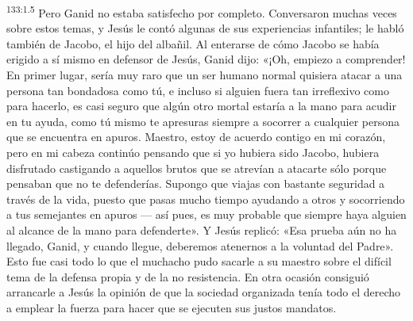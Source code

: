 \par 
\textsuperscript{133:1.5} Pero Ganid no estaba satisfecho por completo. Conversaron muchas veces sobre estos temas, y Jesús le contó algunas de sus experiencias infantiles; le habló también de Jacobo, el hijo del albañil. Al enterarse de cómo Jacobo se había erigido a sí mismo en defensor de Jesús, Ganid dijo: «¡Oh, empiezo a comprender! En primer lugar, sería muy raro que un ser humano normal quisiera atacar a una persona tan bondadosa como tú, e incluso si alguien fuera tan irreflexivo como para hacerlo, es casi seguro que algún otro mortal estaría a la mano para acudir en tu ayuda, como tú mismo te apresuras siempre a socorrer a cualquier persona que se encuentra en apuros. Maestro, estoy de acuerdo contigo en mi corazón, pero en mi cabeza continúo pensando que si yo hubiera sido Jacobo, hubiera disfrutado castigando a aquellos brutos que se atrevían a atacarte sólo porque pensaban que no te defenderías. Supongo que viajas con bastante seguridad a través de la vida, puesto que pasas mucho tiempo ayudando a otros y socorriendo a tus semejantes en apuros --- así pues, es muy probable que siempre haya alguien al alcance de la mano para defenderte». Y Jesús replicó: «Esa prueba aún no ha llegado, Ganid, y cuando llegue, deberemos atenernos a la voluntad del Padre». Esto fue casi todo lo que el muchacho pudo sacarle a su maestro sobre el difícil tema de la defensa propia y de la no resistencia. En otra ocasión consiguió arrancarle a Jesús la opinión de que la sociedad organizada tenía todo el derecho a emplear la fuerza para hacer que se ejecuten sus justos mandatos.

